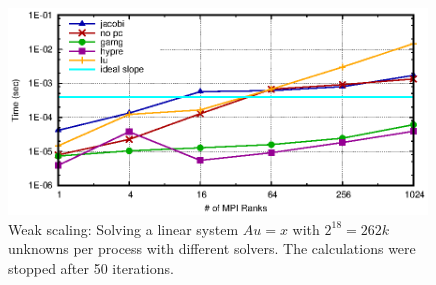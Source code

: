 \begin{figure}[tb]
	\centering
	\includegraphics[width=0.99\textwidth]{ex2_weak_nomaxit}
	\caption{Weak scaling: Solving a linear system $Au = x$ with $2^{18} = 262k$ unknowns per process with different solvers. The calculations were stopped after 50 iterations.} 
	\label{fig:ex2_weak_nomaxit}
\end{figure}
